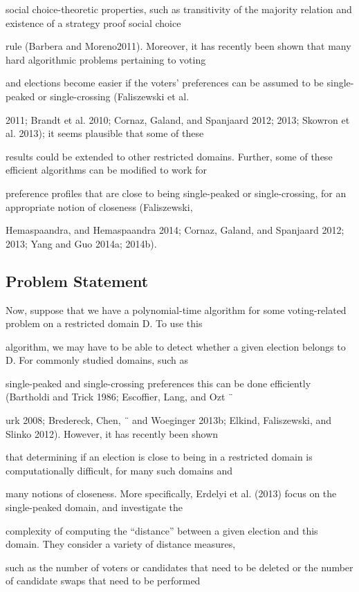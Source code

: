 \documentclass[12pt, a4paper]{report}
\begin{document}
social choice-theoretic properties, such as transitivity of the majority relation and existence of a strategy proof social choice 

rule (Barbera and Moreno2011). Moreover, it has recently been shown that many hard algorithmic problems pertaining to voting 

and elections become easier if the voters’ preferences can be assumed to be single-peaked or single-crossing (Faliszewski et al. 

2011; Brandt et al. 2010; Cornaz, Galand, and Spanjaard 2012; 2013; Skowron et al. 2013); it seems plausible that some of these 

results could be extended to other restricted domains. Further, some of these efficient algorithms can be modified to work for 

preference profiles that are close to being single-peaked or single-crossing, for an appropriate notion of closeness (Faliszewski, 

Hemaspaandra, and Hemaspaandra 2014; Cornaz, Galand, and Spanjaard 2012; 2013; Yang and Guo 2014a; 2014b).
\subsection*{Problem Statement}

 Now, suppose that we have a polynomial-time algorithm for some voting-related problem on a restricted domain D. To use this 

algorithm, we may have to be able to detect whether a given election belongs to D. For commonly studied domains, such as 

single-peaked and single-crossing preferences this can be done efficiently (Bartholdi and Trick 1986; Escoffier, Lang, and Ozt ¨ 

urk 2008; Bredereck, Chen, ¨ and Woeginger 2013b; Elkind, Faliszewski, and Slinko 2012). However, it has recently been shown 

that determining if an election is close to being in a restricted domain is computationally difficult, for many such domains and 

many notions of closeness. More specifically, Erdelyi et al. (2013) focus on the single-peaked domain, and investigate the 

complexity of computing the “distance” between a given election and this domain. They consider a variety of distance measures, 

such as the number of voters or candidates that need to be deleted or the number of candidate swaps that need to be performed 
\end{document}
